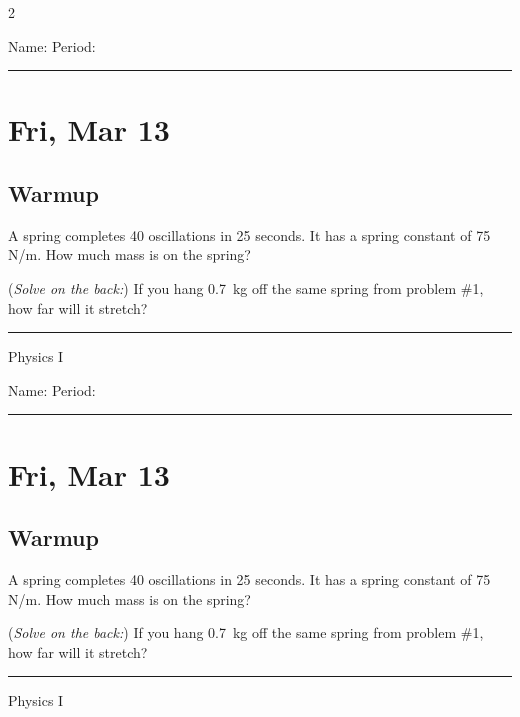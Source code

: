 \documentclass[10pt,landscape]{exam}
\def\todayDate{Fri, Mar 13}
\def\content{
  \begin{questions}
    \question
    	A spring completes 40 oscillations in 25 seconds.  It has a spring constant of 75 N/m.  How much mass is on the spring?

      \vspace{40em}

    \question
      (\emph{Solve on the back:}) If you hang 0.7~kg off the same spring from problem \#1, how far will it stretch?
  \end{questions}

}
\begin{document}
\pagestyle{empty}

\setlength{\columnsep}{0.8in}
\begin{multicols*}{2}

\noindent  
Name: \hfill Period: \hspace{5em}
\vspace{0.5em}
\hrule

\section*{\todayDate}
\subsection*{Warmup}

\content

\vfill
\hrule
\vspace{0.5em}
\hfill {\sc Physics I}

\columnbreak

\noindent  
Name: \hfill Period: \hspace{5em}
\vspace{0.5em}
\hrule

\section*{\todayDate}
\subsection*{Warmup}

\content

\vfill
\hrule
\vspace{0.5em}
\hfill {\sc Physics I}

\end{multicols*}
\end{document}

